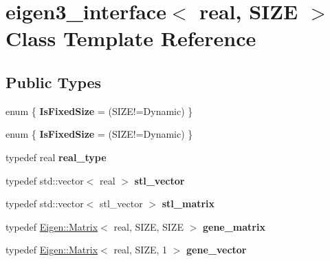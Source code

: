 \hypertarget{classeigen3__interface}{}\section{eigen3\+\_\+interface$<$ real, S\+I\+ZE $>$ Class Template Reference}
\label{classeigen3__interface}
\subsection*{Public Types}
\begin{DoxyCompactItemize}
\item 
\mbox{\label{classeigen3__interface_aa6ecf8d6f3d7da88f6ae461695fcb016}} 
enum \{ {\bfseries Is\+Fixed\+Size} = (S\+I\+Z\+E!=Dynamic)
 \}
\item 
\mbox{\label{classeigen3__interface_aee6af3b276c8061084f18615bf49aaa1}} 
enum \{ {\bfseries Is\+Fixed\+Size} = (S\+I\+Z\+E!=Dynamic)
 \}
\item 
\mbox{\label{classeigen3__interface_a6d74132933df790c39787185aab7fe64}} 
typedef real {\bfseries real\+\_\+type}
\item 
\mbox{\label{classeigen3__interface_afe49c4a51968bc1e38084402b3ac8655}} 
typedef std\+::vector$<$ real $>$ {\bfseries stl\+\_\+vector}
\item 
\mbox{\label{classeigen3__interface_a5d5e9b0a01b31f1a3514ba8e94c36e47}} 
typedef std\+::vector$<$ stl\+\_\+vector $>$ {\bfseries stl\+\_\+matrix}
\item 
\mbox{\label{classeigen3__interface_a5bc270f7b09aa2b73ff9b564b733ac74}} 
typedef \hyperlink{group___core___module_class_eigen_1_1_matrix}{Eigen\+::\+Matrix}$<$ real, S\+I\+ZE, S\+I\+ZE $>$ {\bfseries gene\+\_\+matrix}
\item 
\mbox{\label{classeigen3__interface_aa3bdc03147bb79728d8b6fce9acbe548}} 
typedef \hyperlink{group___core___module_class_eigen_1_1_matrix}{Eigen\+::\+Matrix}$<$ real, S\+I\+ZE, 1 $>$ {\bfseries gene\+\_\+vector}
\item 

\end{DoxyCompactItemize}
